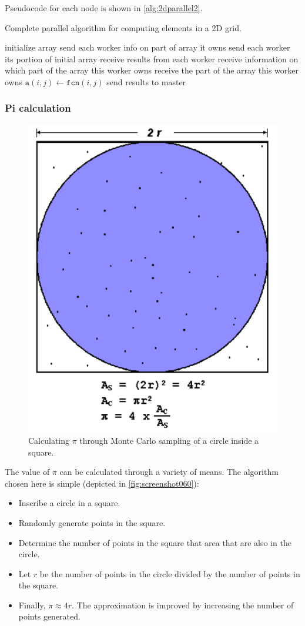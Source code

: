 Pseudocode for each node is shown in \autoref{alg:2dparallel2}.
\begin{algorithm}  
\caption{Complete parallel algorithm for computing elements in a 2D grid.}
\label{alg:2dparallel2}
\begin{algorithmic}
	\State initialize array
	\State send each worker info on part of array it owns  
	\State send each worker its portion of initial array  
	\State receive results from each worker
\Else
	\State receive information on which part of the array this worker owns
	\State receive the part of the array this worker owns
			\State $\mathtt{a}(i,j) \gets \mathtt{fcn}(i,j)$
		\EndFor
	\EndFor
	\State send results to master
\EndIf
\end{algorithmic}
\end{algorithm}

\subsubsection{Pi calculation}
\begin{figure}
\centering
\includegraphics[width=0.4\linewidth]{figures/screenshot060}
\caption{Calculating $\pi$ through Monte Carlo sampling of a circle inside a square.}
\label{fig:screenshot060}
\end{figure}
The value of $\pi$ can be calculated through a variety of means. The algorithm chosen here is simple (depicted in \autoref{fig:screenshot060}): \begin{itemize}
\item Inscribe a circle in a square.
\item Randomly generate points in the square.
\item Determine the number of points in the square that area that are also in the circle.
\item Let $r$ be the number of points in the circle divided by the number of points in the square.
\item Finally, $\pi \approx 4r$. The approximation is improved by increasing the number of points generated.
\end{itemize}


